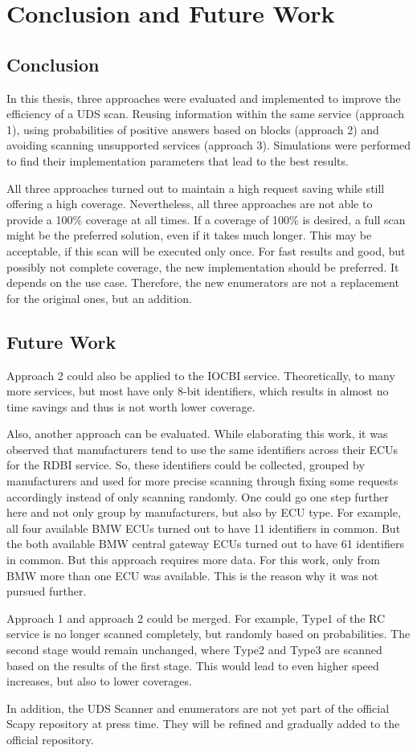 \chapter{Conclusion and Future Work}

\section{Conclusion}

In this thesis, three approaches were evaluated and implemented to improve the efficiency of a UDS scan. Reusing information within the same service (approach 1), using probabilities of positive answers based on blocks (approach 2) and avoiding scanning unsupported services (approach 3). Simulations were performed to find their implementation parameters that lead to the best results.

All three approaches turned out to maintain a high request saving while still offering a high coverage.
Nevertheless, all three approaches are not able to provide a 100\% coverage at all times. 
If a coverage of 100\% is desired, a full scan might be the preferred solution, even if it takes much longer. This may be acceptable, if this scan will be executed only once. For fast results and good, but possibly not complete coverage, the new implementation should be preferred. It depends on the use case. Therefore, the new enumerators are not a replacement for the original ones, but an addition.

\section{Future Work}

Approach 2 could also be applied to the IOCBI service. Theoretically, to many more services, but most have only 8-bit identifiers, which results in almost no time savings and thus is not worth lower coverage.

Also, another approach can be evaluated. While elaborating this work, it was observed that manufacturers tend to use the same identifiers across their ECUs for the RDBI service. So, these identifiers could be collected, grouped by manufacturers and used for more precise scanning through fixing some requests accordingly instead of only scanning randomly. One could go one step further here and not only group by manufacturers, but also by ECU type.
For example, all four available BMW ECUs turned out to have 11 identifiers in common. But the both available BMW central gateway ECUs turned out to have 61 identifiers in common. But this approach requires more data. For this work, only from BMW more than one ECU was available. This is the reason why it was not pursued further.

Approach 1 and approach 2 could be merged. For example, Type1 of the RC service is no longer scanned completely, but randomly based on probabilities. The second stage would remain unchanged, where Type2 and Type3 are scanned based on the results of the first stage. This would lead to even higher speed increases, but also to lower coverages.

In addition, the UDS Scanner and enumerators are not yet part of the official Scapy repository at press time. They will be refined and gradually added to the official repository.
